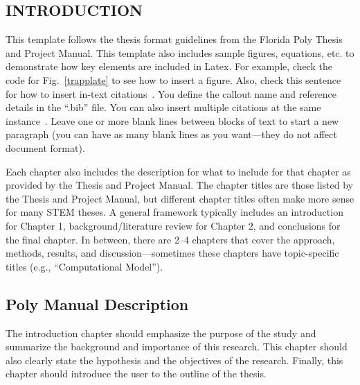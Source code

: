 \documentclass[thesis]{fputhesis}
\author{Student Name}       %
\title{Title of the thesis: the top line should be the longest \and
  the middle one is second longest \and
  and the last is shortest}
\begin{document}
\makefrontmatter


\begin{body}





\chapter{INTRODUCTION}
This template follows the thesis format guidelines from the Florida Poly Thesis and Project Manual. This template also includes sample figures, equations, etc. to demonstrate how key elements are included in Latex. For example, check the code for Fig.~\ref{trapplate} to see how to insert a figure. Also, check this sentence for how to insert in-text citations~\cite{Kelley2017JIMSS}. You define the callout name and reference details in the ``.bib'' file. You can also insert multiple citations at the same instance~\cite{Kelley2017JIMSS,Kelley2019Scitech,Preumont2006M,IEEEstandard,Kauffman2012PhD}. Leave one or more blank lines between blocks of text to start a new paragraph (you can have as many blank lines as you want---they do not affect document format). 

Each chapter also includes the description for what to include for that chapter as provided by the Thesis and Project Manual. The chapter titles are those listed by the Thesis and Project Manual, but different chapter titles often make more sense for many STEM theses. A general framework typically includes an introduction for Chapter 1, background/literature review for Chapter 2, and conclusions for the final chapter. In between, there are 2--4 chapters that cover the approach, methods, results, and discussion---sometimes these chapters have topic-specific titles (e.g., ``Computational Model'').  



\section{Poly Manual Description}
The introduction chapter should emphasize the purpose of the study and summarize the background and importance of this research. This chapter should also clearly state the hypothesis and the objectives of the research. Finally, this chapter should introduce the user to the outline of the thesis.





\end{body}
\end{document}
